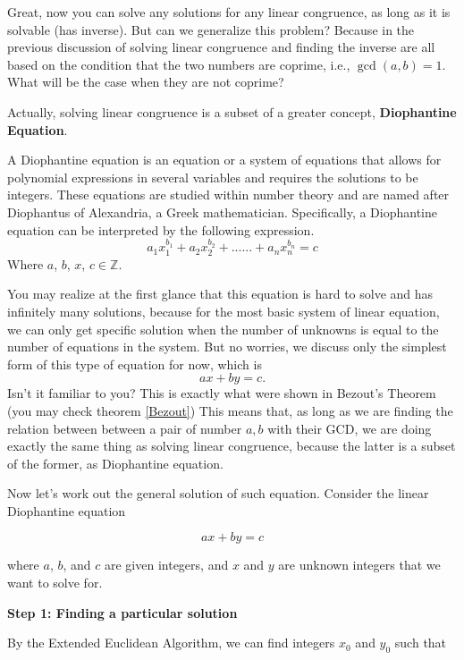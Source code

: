     Great, now you can solve any solutions for any linear congruence, as long as it is solvable (has inverse).
    But can we generalize this problem? Because in the previous discussion of solving linear congruence and
    finding the inverse are all based on the condition that the two numbers are coprime, i.e., $\gcd(a,b)=1$.
    What will be the case when they are not coprime?

    Actually, solving linear congruence is a subset of a greater concept, \textbf{Diophantine Equation}.
    \begin{definition}
        A Diophantine equation is an equation or a system of equations that allows for polynomial expressions in several variables and requires the solutions to be integers. These equations are studied within number theory and are named after Diophantus of Alexandria, a Greek mathematician. Specifically,
        a Diophantine equation can be interpreted by the following expression.
        $$a_{1}x_{1}^{b_{1}}+a_{2}x_{2}^{b_{2}}+......+a_{n}x_{n}^{b_{n}}=c$$
        Where $a$, $b$, $x$, $c \in \mathbb{Z}$. 
    \end{definition}
    You may realize at the first glance that this equation is hard to solve and has infinitely many
    solutions, because for the most basic system of linear equation, we can only get specific solution
    when the number of unknowns is equal to the number of equations in the system. But no worries,
    we discuss only the simplest form of this type of equation for now, which is
    $$ax+by=c \text{.}$$
    Isn't it familiar to you? This is exactly what were shown in Bezout's Theorem (you may check theorem \ref{Bezout})
    This means that, as long as we are finding the relation between between a pair of number $a,b$ with their
    GCD, we are doing exactly the same thing as solving linear congruence, because the latter is
    a subset of the former, as Diophantine equation.

    Now let's work out the general solution of such equation.
    Consider the linear Diophantine equation

\begin{equation}
ax + by = c
\end{equation}

where \(a\), \(b\), and \(c\) are given integers, and \(x\) and \(y\) are unknown integers that we want to solve for. 

\textbf{Step 1: Finding a particular solution}

By the Extended Euclidean Algorithm, we can find integers \(x_0\) and \(y_0\) such that

